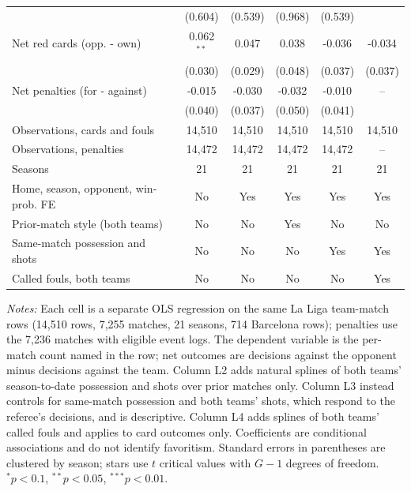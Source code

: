 \begin{table}[htbp]
\begin{tabular}{lccccc}
 & (0.604) & (0.539) & (0.968) & (0.539) &  \\
Net red cards (opp. - own) & 0.062$^{**}$ & 0.047 & 0.038 & -0.036 & -0.034 \\
 & (0.030) & (0.029) & (0.048) & (0.037) & (0.037) \\
Net penalties (for - against) & -0.015 & -0.030 & -0.032 & -0.010 & -- \\
 & (0.040) & (0.037) & (0.050) & (0.041) &  \\
\midrule
Observations, cards and fouls & 14,510 & 14,510 & 14,510 & 14,510 & 14,510 \\
Observations, penalties & 14,472 & 14,472 & 14,472 & 14,472 & -- \\
Seasons & 21 & 21 & 21 & 21 & 21 \\
Home, season, opponent, win-prob. FE & No & Yes & Yes & Yes & Yes \\
Prior-match style (both teams) & No & No & Yes & No & No \\
Same-match possession and shots & No & No & No & Yes & Yes \\
Called fouls, both teams & No & No & No & No & Yes \\
\bottomrule
\end{tabular}
\begin{minipage}{\linewidth}\footnotesize\vspace{0.5em}
\textit{Notes:} Each cell is a separate OLS regression on the same La Liga team-match rows (14,510 rows, 7,255 matches, 21 seasons, 714 Barcelona rows); penalties use the 7,236 matches with eligible event logs. The dependent variable is the per-match count named in the row; net outcomes are decisions against the opponent minus decisions against the team. Column L2 adds natural splines of both teams' season-to-date possession and shots over prior matches only. Column L3 instead controls for same-match possession and both teams' shots, which respond to the referee's decisions, and is descriptive. Column L4 adds splines of both teams' called fouls and applies to card outcomes only. Coefficients are conditional associations and do not identify favoritism. Standard errors in parentheses are clustered by season; stars use $t$ critical values with $G-1$ degrees of freedom. $^{*}p<0.1$, $^{**}p<0.05$, $^{***}p<0.01$.
\end{minipage}
\end{table}
